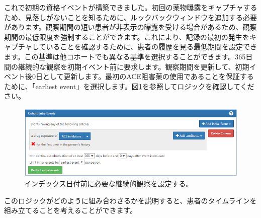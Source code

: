 \documentclass[
  11pt]{book}
\theoremstyle{definition}
\theoremstyle{definition}
\theoremstyle{definition}
\theoremstyle{definition}
\theoremstyle{remark}
\begin{document}
これで初期の資格イベントが構築できました。初回の薬物曝露をキャプチャするため、見落しがないことを知るために、ルックバックウィンドウを追加する必要があります。観察期間の短い患者が非表示の曝露を受ける場合があるため、観察期間の最低限度を強制することができます。これにより、記録の最初の発生をキャプチャしていることを確認するために、患者の履歴を見る最低期間を設定できます。この基準は他コホートでも異なる基準を選択することができます。365日間の継続的な観察を初期イベント前に要求します。観察期間を更新して、初期イベント後0日として更新します。最初のACE阻害薬の使用であることを保証するために、「earliest event」を選択します。図\ref{fig:initialEventAce}を参照してロジックを確認してください。

\begin{figure}

{\centering \includegraphics[width=1\linewidth]{images/Cohorts/initialEventAce} 

}

\caption{インデックス日付前に必要な継続的観察を設定する。}\label{fig:initialEventAce}
\end{figure}

このロジックがどのように組み合わさるかを説明すると、患者のタイムラインを組み立てることを考えることができます。
\end{document}
